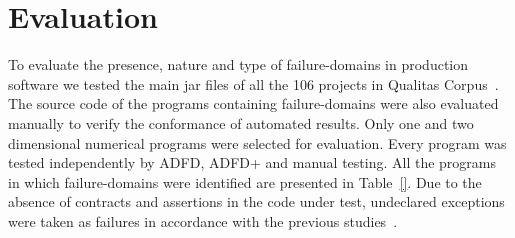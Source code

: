 \documentclass[conference]{IEEEtran}
\begin{document}



\section{Evaluation} \label{sec:evaluation}
To evaluate the presence, nature and type of failure-domains in production software we tested the main jar files of all the 106 projects in Qualitas Corpus~\cite{}. The source code of the programs containing failure-domains were also evaluated manually to verify the conformance of automated results. Only one and two dimensional numerical programs were selected for evaluation. Every program was tested independently by ADFD, ADFD+ and manual testing. All the programs in which failure-domains were identified are presented in Table~\ref{}.  Due to the absence of contracts and assertions in the code under test, undeclared exceptions were taken as failures in accordance with the previous studies~\cite{ahmad2013adfd, Oriol2012}.
\end{document}
